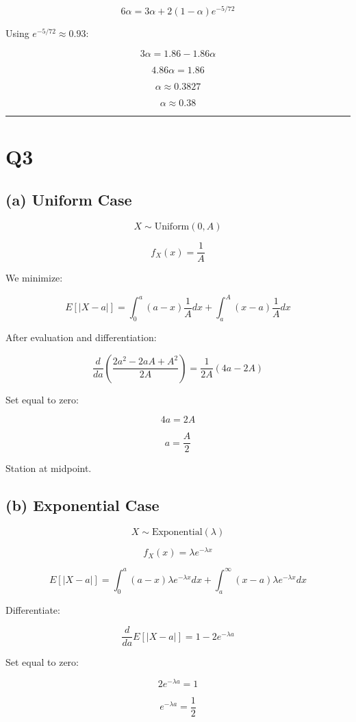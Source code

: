 \documentclass[12pt]{article}
\begin{document}
\[
6\alpha = 3\alpha + 2(1-\alpha)e^{-5/72}
\]

Using $e^{-5/72} \approx 0.93$:

\[
3\alpha = 1.86 - 1.86\alpha
\]

\[
4.86\alpha = 1.86
\]

\[
\alpha \approx 0.3827
\]

\[
\boxed{\alpha \approx 0.38}
\]

\hrule
\vspace{0.5cm}

\section*{Q3}

\subsection*{(a) Uniform Case}

\[
X \sim \text{Uniform}(0,A)
\]

\[
f_X(x) = \frac{1}{A}
\]

We minimize:

\[
E[|X-a|]
=
\int_0^a (a-x)\frac{1}{A}dx
+
\int_a^A (x-a)\frac{1}{A}dx
\]

After evaluation and differentiation:

\[
\frac{d}{da}
\left(
\frac{2a^2 - 2aA + A^2}{2A}
\right)
=
\frac{1}{2A}(4a-2A)
\]

Set equal to zero:

\[
4a = 2A
\]

\[
a = \frac{A}{2}
\]

Station at midpoint.

\subsection*{(b) Exponential Case}

\[
X \sim \text{Exponential}(\lambda)
\]

\[
f_X(x) = \lambda e^{-\lambda x}
\]

\[
E[|X-a|]
=
\int_0^a (a-x)\lambda e^{-\lambda x} dx
+
\int_a^\infty (x-a)\lambda e^{-\lambda x} dx
\]

Differentiate:

\[
\frac{d}{da}E[|X-a|]
=
1 - 2e^{-\lambda a}
\]

Set equal to zero:

\[
2e^{-\lambda a} = 1
\]

\[
e^{-\lambda a} = \frac{1}{2}
\]
\end{document}

